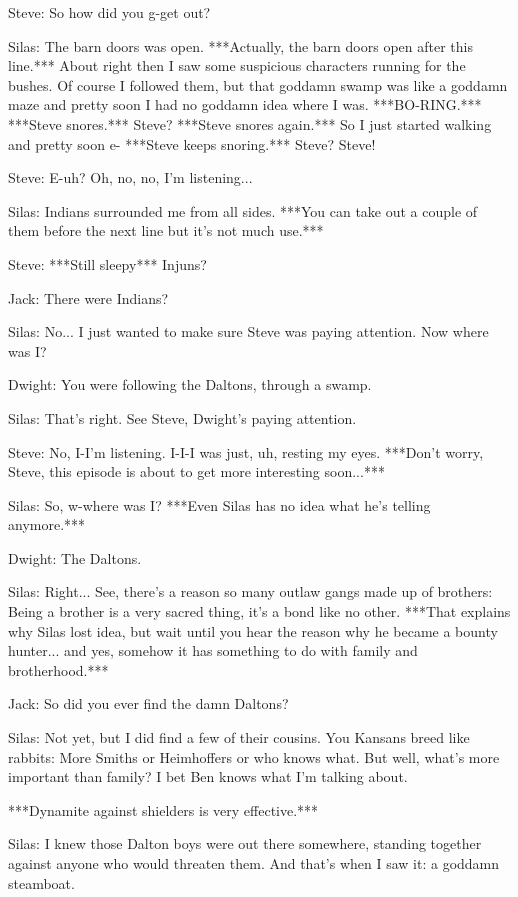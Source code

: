 \documentclass{article}
\begin{document}
Steve: So how did you g-get out?

Silas: The barn doors was open. ***Actually, the barn doors open after this line.*** About right then I saw some suspicious characters running for the bushes. Of course I followed them, but that goddamn swamp was like a goddamn maze and pretty soon I had no goddamn idea where I was. ***BO-RING.*** ***Steve snores.*** Steve? ***Steve snores again.*** So I just started walking and pretty soon e- ***Steve keeps snoring.*** Steve? Steve!

Steve: E-uh? Oh, no, no, I'm listening...

Silas: Indians surrounded me from all sides. ***You can take out a couple of them before the next line but it's not much use.***

Steve: ***Still sleepy*** Injuns?

Jack: There were Indians?

Silas: No... I just wanted to make sure Steve was paying attention. Now where was I?

Dwight: You were following the Daltons, through a swamp.

Silas: That's right. See Steve, Dwight's paying attention.

Steve: No, I-I'm listening. I-I-I was just, uh, resting my eyes. ***Don't worry, Steve, this episode is about to get more interesting soon...***

Silas: So, w-where was I? ***Even Silas has no idea what he's telling anymore.***

Dwight: The Daltons.

Silas: Right... See, there's a reason so many outlaw gangs made up of brothers: Being a brother is a very sacred thing, it's a bond like no other. ***That explains why Silas lost idea, but wait until you hear the reason why he became a bounty hunter... and yes, somehow it has something to do with family and brotherhood.***

Jack: So did you ever find the damn Daltons?

Silas: Not yet, but I did find a few of their cousins. You Kansans breed like rabbits: More Smiths or Heimhoffers or who knows what. But well, what's more important than family? I bet Ben knows what I'm talking about.

***Dynamite against shielders is very effective.***

Silas: I knew those Dalton boys were out there somewhere, standing together against anyone who would threaten them. And that's when I saw it: a goddamn steamboat.
\end{document}
